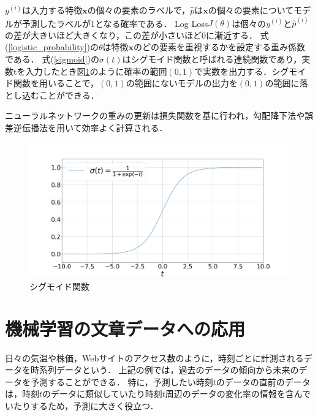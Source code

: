 \documentclass[12pt,a4j]{jreport}
\begin{document}
$y^{(i)}$は入力する特徴$\mathbf{x}$の個々の要素のラベルで，$\hat{p}$は$\mathbf{x}$の個々の要素についてモデルが予測したラベルが1となる確率である．
Log Loss$J(\theta)$は個々の$y^{(i)}$と$\hat{p}^{(i)}$の差が大きいほど大きくなり，この差が小さいほど0に漸近する．
式(\ref{logistic_probability})の$\theta$は特徴$\mathbf{x}$のどの要素を重視するかを設定する重み係数である．
式(\ref{sigmoid})の$\sigma(t)$はシグモイド関数と呼ばれる連続関数であり，実数tを入力したとき図\ref{fig_sigmoid}のように確率の範囲$(0, 1)$で実数を出力する．シグモイド関数を用いることで，$(0, 1)$の範囲にないモデルの出力を$(0, 1)$の範囲に落とし込むことができる．

ニューラルネットワークの重みの更新は損失関数を基に行われ，勾配降下法や誤差逆伝播法を用いて効率よく計算される．

\begin{figure}[H]
  \centering
  \includegraphics[keepaspectratio, width=120mm]{img/sigmoid.png}
  \caption{シグモイド関数}
  \label{fig_sigmoid}
\end{figure}





\section{機械学習の文章データへの応用}
\label{apply_for_time_series_data}
日々の気温や株価，Webサイトのアクセス数のように，時刻ごとに計測されるデータを時系列データという\cite{aurellen20}．
上記の例では，過去のデータの傾向から未来のデータを予測することができる．
特に，予測したい時刻$t$のデータの直前のデータは，時刻$t$のデータに類似していたり時刻$t$周辺のデータの変化率の情報を含んでいたりするため，予測に大きく役立つ．
\end{document}
